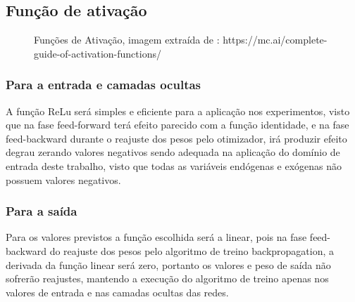 \documentclass[	12pt, Times, openright, twoside, a4paper, english, brazil]{abntex2}
\begin{document}
	\subsection{Função de ativação}
	    \begin{figure}[!ht]
        	\caption{Funções de Ativação, imagem extraída de : \cite{MCAI} https://mc.ai/complete-guide-of-activation-functions/ \label{fig:activation_functions}}
        \end{figure}
	    \subsubsection{Para a entrada e camadas ocultas}
    	    A função ReLu será simples e eficiente para a aplicação nos experimentos, visto que na fase feed-forward terá efeito parecido com a função identidade, e na fase feed-backward durante o reajuste dos pesos pelo otimizador, irá produzir efeito degrau zerando valores negativos sendo adequada na aplicação do domínio de entrada deste trabalho, visto que todas as variáveis endógenas e exógenas não possuem valores negativos.
    	\subsubsection{Para a saída}
    	    Para os valores previstos a função escolhida será a linear, pois na fase feed-backward do reajuste dos pesos pelo algoritmo de treino backpropagation, a derivada da função linear será zero, portanto os valores e peso de saída não sofrerão reajustes, mantendo a execução do algoritmo de treino apenas nos valores de entrada e nas camadas ocultas das redes.
\end{document}

